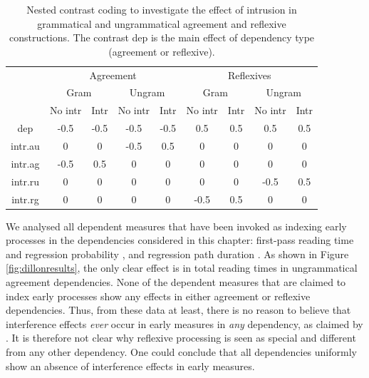 \documentclass{cambridge7A}\usepackage[]{graphicx}\usepackage[]{color}
\begin{document}
\begin{table}[!htbp]
\begin{center}
\begin{tabular}{ccccccccc}
      & \multicolumn{4}{c}{Agreement} &  \multicolumn{4}{c}{Reflexives} \\
      & \multicolumn{2}{c}{Gram} & \multicolumn{2}{c}{Ungram} & \multicolumn{2}{c}{Gram} & \multicolumn{2}{c}{Ungram} \\  
      & No intr & Intr & No intr & Intr & No intr & Intr & No intr & Intr \\   
dep   & -0.5  & -0.5  & -0.5  & -0.5  &  0.5  &  0.5  &  0.5  &  0.5\\
intr.au &  0  &  0  & -0.5  &  0.5  &  0  &  0  &  0  &  0\\
intr.ag & -0.5  &  0.5  &  0  &  0 &    0  &  0  &  0  &  0\\
intr.ru & 0   & 0   & 0   & 0  &   0    & 0 &  -0.5 &   0.5\\
intr.rg & 0   & 0   & 0   & 0  &  -0.5  &  0.5  & 0 &   0\\
\end{tabular}
\end{center}
\caption{Nested contrast coding to investigate the effect of intrusion in grammatical and ungrammatical agreement and reflexive constructions. The contrast dep is the main effect of dependency type (agreement or reflexive).}
\label{dillon13nestedcoding}
\end{table}%

We analysed all dependent measures that have been invoked as indexing  early processes in the dependencies considered in this chapter: first-pass reading time and regression probability \citep{DillonMishlerSloggett2013}, and regression path duration \citep{CunningsSturt2018}. As shown in Figure \ref{fig:dillonresults}, the only clear effect is in total reading times in ungrammatical agreement dependencies. None of the dependent measures that are claimed to index early processes show any effects in either agreement or reflexive dependencies. 
Thus, from these data at least, there is no reason to believe that interference effects \textit{ever} occur in early measures in \textit{any} dependency, as claimed by \cite{Sturt2003}. It is therefore not clear why reflexive processing is seen as special and different from any other dependency. One could conclude that all dependencies uniformly show an absence of interference effects in early measures.
\end{document}
